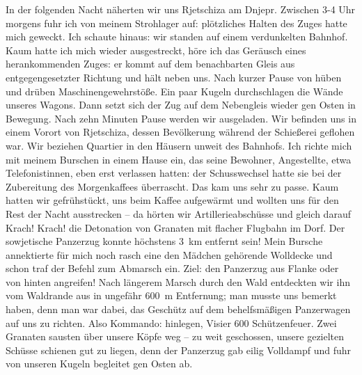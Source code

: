 \documentclass[a5paper,pagesize,10pt,twoside=true]{scrbook}
\begin{document}
In der folgenden Nacht näherten wir uns Rjetschiza am Dnjepr. Zwischen 3-4 Uhr morgens fuhr ich von meinem Strohlager auf: plötzliches Halten des Zuges hatte mich geweckt. Ich schaute hinaus: wir standen auf einem verdunkelten Bahnhof. Kaum hatte ich mich wieder ausgestreckt, höre ich das Geräusch eines herankommenden Zuges: er kommt auf dem benachbarten Gleis aus entgegengesetzter Richtung und hält neben uns. Nach kurzer Pause von hüben und drüben Maschinengewehrstöße. Ein paar Kugeln durchschlagen die Wände unseres Wagons. Dann setzt sich der Zug auf dem Nebengleis wieder gen Osten in Bewegung. Nach zehn Minuten Pause werden wir ausgeladen. Wir befinden uns in einem Vorort von Rjetschiza, dessen Bevölkerung während der Schießerei geflohen war. Wir beziehen Quartier in den Häusern unweit des Bahnhofs. Ich richte mich mit meinem Burschen in einem Hause ein, das seine Bewohner, Angestellte, etwa Telefonistinnen, eben erst verlassen hatten: der Schusswechsel hatte sie bei der Zubereitung des Morgenkaffees überrascht. Das kam uns sehr zu passe. Kaum hatten wir gefrühstückt, uns beim Kaffee aufgewärmt und wollten uns für den Rest der Nacht ausstrecken -- da hörten wir Artillerieabschüsse und gleich darauf Krach! Krach! die Detonation von Granaten mit flacher Flugbahn im Dorf. Der sowjetische Panzerzug konnte höchstens 3~km entfernt sein! Mein Bursche annektierte für mich noch rasch eine den Mädchen gehörende Wolldecke und schon traf der Befehl zum Abmarsch ein. Ziel: den Panzerzug aus Flanke oder von hinten angreifen! Nach längerem Marsch durch den Wald entdeckten wir ihn vom Waldrande aus in ungefähr 600~m Entfernung; man musste uns bemerkt haben, denn man war dabei, das Geschütz auf dem behelfsmäßigen Panzerwagen auf uns zu richten. Also Kommando: hinlegen, Visier 600 Schützenfeuer. Zwei Granaten sausten über unsere Köpfe weg -- zu weit geschossen, unsere gezielten Schüsse schienen gut zu liegen, denn der Panzerzug gab eilig Volldampf und fuhr von unseren Kugeln begleitet gen Osten ab.
\end{document}
